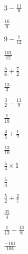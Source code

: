 \documentclass[12pt]{exam}
\begin{document}
\begin{questions}
\begin{multicols}{2}
		\question $3 - \frac{11}{9}$

		\begin{solution}

			$\frac{16}{9}$

		\end{solution}


		\question $9 - \frac{7}{12}$

		\begin{solution}

			$\frac{101}{12}$

		\end{solution}


		\question $\frac{5}{6} + \frac{7}{2}$

		\begin{solution}

			$\frac{13}{3}$

		\end{solution}


		\question $\frac{3}{2} - \frac{13}{9}$

		\begin{solution}

			$\frac{1}{18}$

		\end{solution}


		\question $\frac{4}{5} + \frac{1}{2}$

		\begin{solution}

			$\frac{13}{10}$

		\end{solution}


		\question $\frac{5}{4} \times 1$

		\begin{solution}

			$\frac{5}{4}$

		\end{solution}


		\question $\frac{5}{2} \div \frac{2}{7}$

		\begin{solution}

			$\frac{35}{4}$

		\end{solution}


		\question $\frac{1}{13} - \frac{13}{8}$

		\begin{solution}

			$\frac{-161}{104}$


\end{solution}
\end{multicols}
\end{questions}
\end{document}
